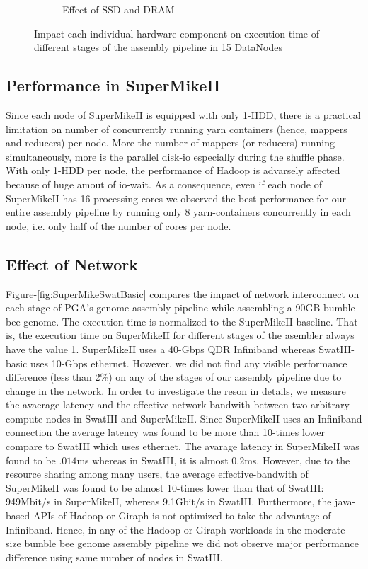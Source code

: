 \documentclass[conference]{IEEEtran}
\begin{document}
\begin{figure}[htb]
\begin{subfigure}[b]{0.23\textwidth}
                \caption{Effect of SSD and DRAM}
                \label{fig:SuperMikeSwatStorageMemory}
   \end{subfigure}
   \caption{Impact each individual hardware component on execution time of different stages of the assembly pipeline in 15 DataNodes }
  \label{fig:SuperMikeSwat}
\end{figure}

\subsection {Performance in SuperMikeII}
\label{PerformanceInSuperMikeII}
Since each node of SuperMikeII is equipped with only 1-HDD, there is a practical limitation on number of concurrently running yarn containers (hence, mappers and reducers) per node. 
More the number of mappers (or reducers) running simultaneously, more is the parallel disk-io especially during the shuffle phase. 
With only 1-HDD per node, the performance of Hadoop is advarsely affected because of huge amout of io-wait.
As a consequence, even if each node of SuperMikeII has 16 processing cores we observed the best performance for our entire assembly pipeline by running only 8 yarn-containers concurrently in each node, i.e. only half of the number of cores per node.

\subsection {Effect of Network} \label{EffectOfNetwork}
Figure-\ref{fig:SuperMikeSwatBasic} compares the impact of network interconnect on each stage of PGA's genome assembly pipeline while assembling a 90GB bumble bee genome. 
The execution time is normalized to the SuperMikeII-baseline. That is, the execution time on SuperMikeII for different stages of the asembler always have the value 1.
SuperMikeII uses a 40-Gbps QDR Infiniband whereas SwatIII-basic uses 10-Gbps ethernet. 
However, we did not find any visible performance difference (less than 2\%) on any of the stages of our assembly pipeline due to change in the network.
In order to investigate the reson in details, we measure the avaerage latency and the effective network-bandwith between two arbitrary compute nodes in SwatIII and SuperMikeII.
Since SuperMikeII uses an Infiniband connection the average latency was found to be more than 10-times lower compare to SwatIII which uses ethernet.
The avarage latency in SuperMikeII was found to be $.014$ms whereas in SwatIII, it is almost $0.2$ms.
However, due to the resource sharing among many users, the average effective-bandwith of SuperMikeII was found to be almost 10-times lower than that of SwatIII: 949Mbit/s in SuperMikeII, whereas 9.1Gbit/s in SwatIII.
Furthermore, the java-based APIs of Hadoop or Giraph is not optimized to take the advantage of Infiniband. 
Hence, in any of the Hadoop or Giraph workloads in the moderate size bumble bee genome assembly pipeline we did not observe major performance difference using same number of nodes in SwatIII.
 
\end{document}
